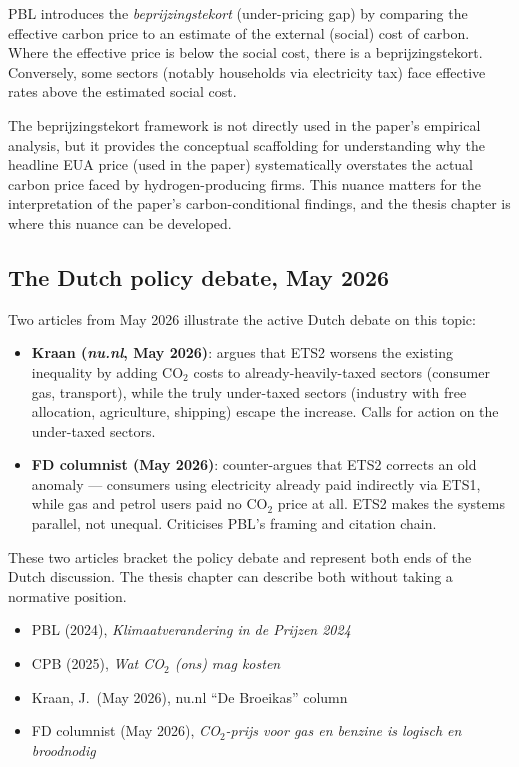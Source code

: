 \documentclass[11pt,a4paper]{article}
\begin{document}
PBL introduces the \emph{beprijzingstekort} (under-pricing gap) by comparing the effective carbon price to an estimate of the external (social) cost of carbon. Where the effective price is below the social cost, there is a beprijzingstekort. Conversely, some sectors (notably households via electricity tax) face effective rates above the estimated social cost.

\begin{rationale}
The beprijzingstekort framework is not directly used in the paper's empirical analysis, but it provides the conceptual scaffolding for understanding why the headline EUA price (used in the paper) systematically overstates the actual carbon price faced by hydrogen-producing firms. This nuance matters for the interpretation of the paper's carbon-conditional findings, and the thesis chapter is where this nuance can be developed.
\end{rationale}

\subsection{The Dutch policy debate, May 2026}

Two articles from May 2026 illustrate the active Dutch debate on this topic:

\begin{itemize}
  \item \textbf{Kraan (\emph{nu.nl}, May 2026)}: argues that ETS2 worsens the existing inequality by adding CO$_2$ costs to already-heavily-taxed sectors (consumer gas, transport), while the truly under-taxed sectors (industry with free allocation, agriculture, shipping) escape the increase. Calls for action on the under-taxed sectors.
  \item \textbf{FD columnist (May 2026)}: counter-argues that ETS2 corrects an old anomaly --- consumers using electricity already paid indirectly via ETS1, while gas and petrol users paid no CO$_2$ price at all. ETS2 makes the systems parallel, not unequal. Criticises PBL's framing and citation chain.
\end{itemize}

These two articles bracket the policy debate and represent both ends of the Dutch discussion. The thesis chapter can describe both without taking a normative position.

\begin{keysources}
\begin{itemize}
  \item PBL (2024), \emph{Klimaatverandering in de Prijzen 2024} 
  \item CPB (2025), \emph{Wat CO$_2$ (ons) mag kosten}
  \item Kraan, J.\ (May 2026), nu.nl ``De Broeikas'' column
  \item FD columnist (May 2026), \emph{CO$_2$-prijs voor gas en benzine is logisch en broodnodig}
\end{itemize}
\end{keysources}
\end{document}
